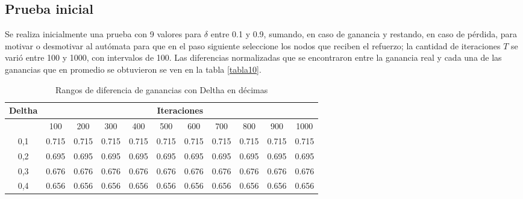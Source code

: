 \subsection{Prueba inicial}

Se realiza inicialmente una prueba con 9 valores para $\delta$ entre 0.1 y 0.9, sumando, en caso de ganancia y restando, en caso de pérdida, para motivar o desmotivar al autómata para que en el paso siguiente seleccione los nodos que reciben el refuerzo; la cantidad de iteraciones $T$ se varió entre 100 y 1000, con intervalos de 100. Las diferencias normalizadas que se encontraron entre la ganancia real y cada una de las ganancias que en promedio se obtuvieron se ven en la tabla \ref{tabla10}.

\begin{table}[H]
\small
\caption{Rangos de diferencia de ganancias con Deltha en décimas}
\begin{tabular}{crrrrrrrrrr}
\hline
\multicolumn{1}{l}{Deltha} & \multicolumn{10}{c}{Iteraciones} \\ \hline
\multicolumn{1}{l}{}       & \multicolumn{1}{c}{100} & \multicolumn{1}{c}{200} & \multicolumn{1}{c}{300} & \multicolumn{1}{c}{400} & \multicolumn{1}{c}{500} & \multicolumn{1}{c}{600} & \multicolumn{1}{c}{700} & \multicolumn{1}{c}{800} & \multicolumn{1}{c}{900} & \multicolumn{1}{c}{1000} \\ \hline
0,1                          & 0.715                    & 0.715                    & 0.715                    & 0.715                    & 0.715                    & 0.715                    & 0.715                    & 0.715                    & 0.715                    & 0.715                     \\ 
0,2                          & 0.695                    & 0.695                    & 0.695                    & 0.695                    & 0.695                    & 0.695                    & 0.695                    & 0.695                    & 0.695                    & 0.695                     \\ 
0,3                          & 0.676                    & 0.676                    & 0.676                    & 0.676                    & 0.676                    & 0.676                    & 0.676                    & 0.676                    & 0.676                    & 0.676                     \\ 
0,4                          & 0.656                    & 0.656                    & 0.656                    & 0.656                    & 0.656                    & 0.656                    & 0.656                    & 0.656                    & 0.656                    & 0.656                     \\ 

\end{tabular}
\end{table}
